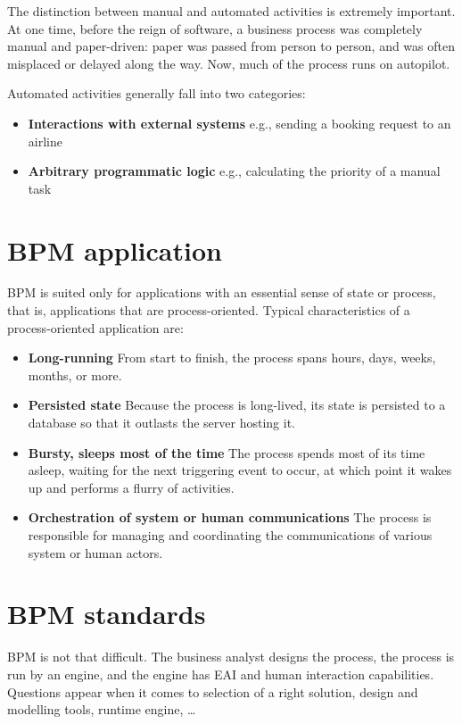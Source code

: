 	The distinction between manual and automated activities is extremely important. At one time, before the reign of
	software, a business process was completely manual and paper-driven: paper was passed from person to person, and was
	often misplaced or delayed along the way. Now, much of the process runs on autopilot.

	Automated activities generally fall into two categories:
	\begin{itemize}
		\item \textbf{Interactions with external systems} e.g., sending a booking request to an airline
		\item \textbf{Arbitrary programmatic logic} e.g., calculating the priority of a manual task	   
	\end{itemize}
	
	\section{BPM application}
	
	BPM is suited only for applications with an essential sense of state or process, that is, applications that are
	process-oriented. Typical characteristics of a process-oriented application are:
	
	\begin{itemize}
		\item \textbf{Long-running}
		From start to finish, the process spans hours, days, weeks, months, or more.
		\item \textbf{Persisted state}
		Because the process is long-lived, its state is persisted to a database so that it outlasts the server hosting it.
		\item \textbf{Bursty, sleeps most of the time}
		The process spends most of its time asleep, waiting for the next triggering event to occur, at which point it wakes up
		and performs a flurry of activities.
		\item \textbf{Orchestration of system or human communications}
		The process is responsible for managing and coordinating the communications of various system or human actors.
	\end{itemize}

	\section{BPM standards}
	
	BPM is not that difficult. The business analyst designs the process, the process is run by an engine, and the engine
	has EAI and human interaction capabilities. Questions appear when it comes to selection of a right solution, design and
	modelling tools, runtime engine, \ldots
	
